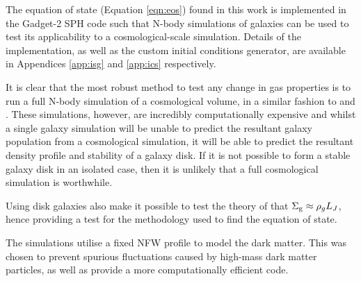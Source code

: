 The equation of state (Equation \ref{eqn:eos}) found in this work is implemented in the Gadget-2 SPH code \citep{springel_cosmological_2005} such that N-body simulations of galaxies can be used to test its applicability to a cosmological-scale simulation.
Details of the implementation, as well as the custom initial conditions generator, are available in Appendices \ref{app:isg} and \ref{app:ics} respectively.

It is clear that the most robust method to test any change in gas properties is to run a full N-body simulation of a cosmological volume, in a similar fashion to \citet{vogelsberger_introducing_2014} and \citet{schaye_eagle_2015}.
These simulations, however, are incredibly computationally expensive and whilst a single galaxy simulation will be unable to predict the resultant galaxy population from a cosmological simulation, it will be able to predict the resultant density profile and stability of a galaxy disk.
If it is not possible to form a stable galaxy disk in an isolated case, then it is unlikely that a full cosmological simulation is worthwhile.

Using disk galaxies also make it possible to test the theory of \citet{schaye_model-independent_2001} that $\Sigma_\mathrm{g} \approx \rho_g L_J$, hence providing a test for the methodology used to find the equation of state.

The simulations utilise a fixed NFW profile \citep{navarro_structure_1996, coe_dark_2010} to model the dark matter.
This was chosen to prevent spurious fluctuations caused by high-mass dark matter particles, as well as provide a more computationally efficient code.
